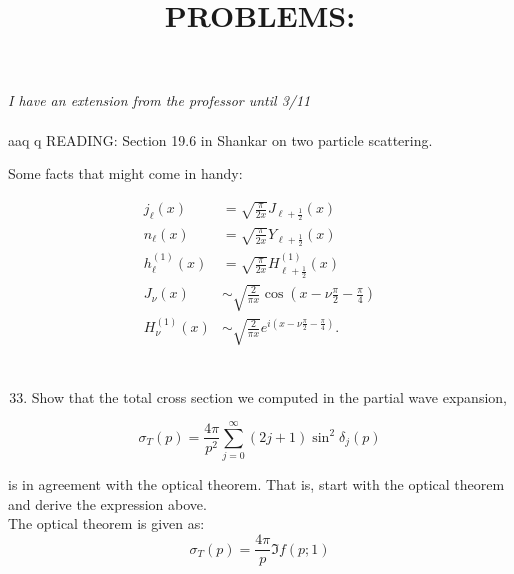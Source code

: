 \documentclass[12pt]{article}
\title{PROBLEMS: }
\author{}
\date{}
\begin{document}
\maketitle
\emph{I have an extension from the professor until 3/11}\\\\aaq q
READING: Section 19.6 in Shankar on two particle scattering.

Some facts that might come in handy:


\begin{align*}
j_{\ell}(x) & =\sqrt{\frac{\pi}{2 x}} J_{\ell+\frac{1}{2}}(x)  \tag{1}\\
n_{\ell}(x) & =\sqrt{\frac{\pi}{2 x}} Y_{\ell+\frac{1}{2}}(x)  \tag{2}\\
h_{\ell}^{(1)}(x) & =\sqrt{\frac{\pi}{2 x}} H_{\ell+\frac{1}{2}}^{(1)}(x)  \tag{3}\\
J_{\nu}(x) & \sim \sqrt{\frac{2}{\pi x}} \cos \left(x-\nu \frac{\pi}{2}-\frac{\pi}{4}\right)  \tag{4}\\
H_{\nu}^{(1)}(x) & \sim \sqrt{\frac{2}{\pi x}} e^{i\left(x-\nu \frac{\pi}{2}-\frac{\pi}{4}\right)} . \tag{5}
\end{align*}

\section{}
\begin{enumerate}
  \setcounter{enumi}{32}
  \item Show that the total cross section we computed in the partial wave expansion,
\end{enumerate}


\begin{equation*}
\sigma_{T}(p)=\frac{4 \pi}{p^{2}} \sum_{j=0}^{\infty}(2 j+1) \sin ^{2} \delta_{j}(p) \tag{6}
\end{equation*}


is in agreement with the optical theorem. That is, start with the optical theorem and derive the expression above.\\
The optical theorem is given as:
$$
\sigma_T(p)=\frac{4 \pi}{p} \Im f(p ; 1)
$$
\end{document}
